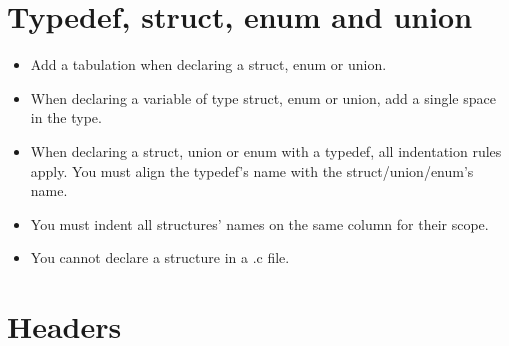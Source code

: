 \documentclass{42-en}
\begin{document}
    \section{Typedef, struct, enum and union}

        \begin{itemize}

            \item Add a tabulation when declaring a struct, enum or union.

            \item When declaring a variable of type struct, enum or union,
                add a single space in the type.

            \item When declaring a struct, union or enum with a typedef,
                all indentation rules apply. You must align the typedef's name
                with the struct/union/enum's name.

            \item You must indent all structures' names on the same column for their scope.

            \item You cannot declare a structure in a .c file.

        \end{itemize}
        \newpage


    \section{Headers}
\end{document}
